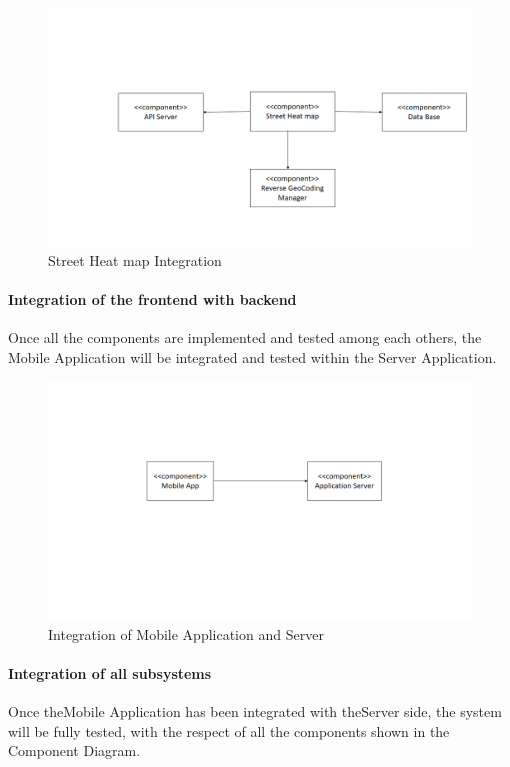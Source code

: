 \begin{figure}[H]
\centering
\includegraphics[width=\textwidth]{Images/StreetHeatmapIntegration.png}
\caption{\label{fig:StreetHeatmapIntegration}Street Heat map Integration}
\end{figure}


\paragraph{Integration of the frontend with backend}
Once all the components are implemented and tested among each others, the Mobile Application will be integrated and tested within the Server Application. \\

\begin{figure}[H]
\centering
\includegraphics[width=\textwidth]{Images/MobileServerIntegration.png}
\caption{\label{fig:MobileServerIntegration} Integration of Mobile Application and Server }
\end{figure}

\paragraph{Integration of all subsystems}
Once theMobile Application has been integrated with theServer side, the system will be fully tested, with the respect of all the components shown in the Component Diagram.
